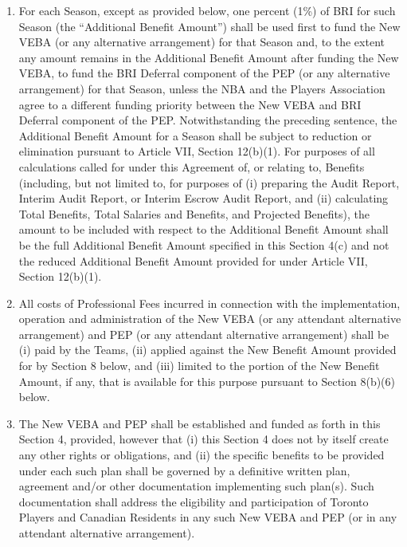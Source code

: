 \documentclass[
]{book}
\begin{document}
\begin{enumerate}
\begin{enumerate}
\begin{enumerate}
    \end{enumerate}
  \end{enumerate}
\item
  For each Season, except as provided below, one percent (1\%) of BRI for such Season (the ``Additional Benefit Amount'') shall be used first to fund the New VEBA (or any alternative arrangement) for that Season and, to the extent any amount remains in the Additional Benefit Amount after funding the New VEBA, to fund the BRI Deferral component of the PEP (or any alternative arrangement) for that Season, unless the NBA and the Players Association agree to a different funding priority between the New VEBA and BRI Deferral component of the PEP. Notwithstanding the preceding sentence, the Additional Benefit Amount for a Season shall be subject to reduction or elimination pursuant to Article VII, Section 12(b)(1). For purposes of all calculations called for under this Agreement of, or relating to, Benefits (including, but not limited to, for purposes of (i) preparing the Audit Report, Interim Audit Report, or Interim Escrow Audit Report, and (ii) calculating Total Benefits, Total Salaries and Benefits, and Projected Benefits), the amount to be included with respect to the Additional Benefit Amount shall be the full Additional Benefit Amount specified in this Section 4(c) and not the reduced Additional Benefit Amount provided for under Article VII, Section 12(b)(1).
\item
  All costs of Professional Fees incurred in connection with the implementation, operation and administration of the New VEBA (or any attendant alternative arrangement) and PEP (or any attendant alternative arrangement) shall be (i) paid by the Teams, (ii) applied against the New Benefit Amount provided for by Section 8 below, and (iii) limited to the portion of the New Benefit Amount, if any, that is available for this purpose pursuant to Section 8(b)(6) below.
\item
  The New VEBA and PEP shall be established and funded as forth in this Section 4, provided, however that (i) this Section 4 does not by itself create any other rights or obligations, and (ii) the specific benefits to be provided under each such plan shall be governed by a definitive written plan, agreement and/or other documentation implementing such plan(s). Such documentation shall address the eligibility and participation of Toronto Players and Canadian Residents in any such New VEBA and PEP (or in any attendant alternative arrangement).
\end{enumerate}
\end{document}
